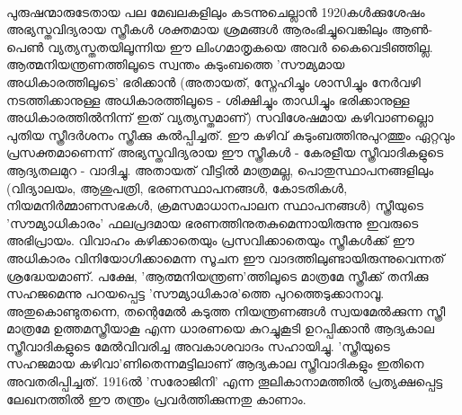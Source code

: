 \paragraph{}പുരുഷന്മാരുടേതായ പല മേഖലകളിലും കടന്നുചെല്ലാൻ 1920കൾക്കുശേഷം അഭ്യസ്തവിദ്യരായ സ്ത്രീകൾ ശക്തമായ ശ്രമങ്ങൾ ആരംഭിച്ചുവെങ്കിലും ആൺ-പെൺ വ്യത്യസ്തതയിലൂന്നിയ ഈ ലിംഗമാതൃകയെ അവർ കൈവെടിഞ്ഞില്ല. ആത്മനിയന്ത്രണത്തിലൂടെ സ്വന്തം കുടുംബത്തെ 'സൗമ്യമായ അധികാരത്തിലൂടെ' ഭരിക്കാൻ (അതായത്, സ്നേഹിച്ചും ശാസിച്ചും നേർവഴി നടത്തിക്കാനുള്ള അധികാരത്തിലൂടെ - ശിക്ഷിച്ചും താഡിച്ചും ഭരിക്കാനുള്ള അധികാരത്തിൽനിന്ന് ഇത് വ്യത്യസ്തമാണ്) സവിശേഷമായ കഴിവാണല്ലൊ പുതിയ സ്ത്രീദർശനം സ്ത്രീക്കു കൽപ്പിച്ചത്. ഈ കഴിവ് കുടുംബത്തിനുപുറത്തും ഏറ്റവും പ്രസക്തമാണെന്ന് അഭ്യസ്തവിദ്യരായ ഈ സ്ത്രീകൾ - കേരളീയ സ്ത്രീവാദികളുടെ ആദ്യതലമുറ - വാദിച്ചു. അതായത് വീട്ടിൽ മാത്രമല്ല, പൊതുസ്ഥാപനങ്ങളിലും (വിദ്യാലയം, ആശുപത്രി, ഭരണസ്ഥാപനങ്ങൾ, കോടതികൾ, നിയമനിർമ്മാണസഭകൾ, ക്രമസമാധാനപാലന സ്ഥാപനങ്ങൾ) സ്ത്രീയുടെ 'സൗമ്യാധികാരം' ഫലപ്രദമായ ഭരണത്തിനുതകുമെന്നായിരുന്നു ഇവരുടെ അഭിപ്രായം. വിവാഹം കഴിക്കാതെയും പ്രസവിക്കാതെയും സ്ത്രീകൾക്ക് ഈ അധികാരം വിനിയോഗിക്കാമെന്ന സൂചന ഈ വാദത്തിലുണ്ടായിരുന്നുവെന്നത് ശ്രദ്ധേയമാണ്. പക്ഷേ, 'ആത്മനിയന്ത്രണ'ത്തിലൂടെ മാത്രമേ സ്ത്രീക്ക് തനിക്കു സഹജമെന്നു പറയപ്പെട്ട 'സൗമ്യാധികാര'ത്തെ പുറത്തെടുക്കാനാവൂ. അതുകൊണ്ടുതന്നെ, തന്റെമേൽ കടുത്ത നിയന്ത്രണങ്ങൾ സ്വയമേൽക്കുന്ന സ്ത്രീ മാത്രമേ ഉത്തമസ്ത്രീയാകൂ എന്ന ധാരണയെ കുറച്ചുകൂടി ഉറപ്പിക്കാൻ ആദ്യകാല സ്ത്രീവാദികളുടെ മേൽവിവരിച്ച അവകാശവാദം സഹായിച്ചു. 'സ്ത്രീയുടെ സഹജമായ കഴിവാ'ണിതെന്നമട്ടിലാണ് ആദ്യകാല സ്ത്രീവാദികളും ഇതിനെ അവതരിപ്പിച്ചത്. 1916ൽ 'സരോജിനി' എന്ന തൂലികാനാമത്തിൽ പ്രത്യക്ഷപ്പെട്ട ലേഖനത്തിൽ ഈ തന്ത്രം പ്രവർത്തിക്കുന്നതു കാണാം.

